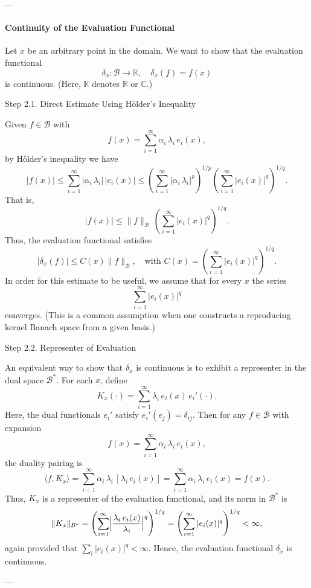 ---

\paragraph{Continuity of the Evaluation Functional}

Let \(x\) be an arbitrary point in the domain. We want to show that the evaluation functional
\[
\delta_x : \mathcal{B} \to \mathbb{K},\quad \delta_x(f)=f(x)
\]
is continuous. (Here, \(\mathbb{K}\) denotes \(\mathbb{R}\) or \(\mathbb{C}\).)

Step 2.1. Direct Estimate Using Hölder’s Inequality

Given \(f\in\mathcal{B}\) with
\[
f(x)=\sum_{i=1}^\infty \alpha_i\,\lambda_i\, e_i(x),
\]
by Hölder’s inequality we have
\[
|f(x)| \le \sum_{i=1}^\infty |\alpha_i\,\lambda_i|\, |e_i(x)|
\le \left(\sum_{i=1}^\infty |\alpha_i\,\lambda_i|^p\right)^{1/p}\left(\sum_{i=1}^\infty |e_i(x)|^q\right)^{1/q}.
\]
That is,
\[
|f(x)| \le \|f\|_{\mathcal{B}}\,\left(\sum_{i=1}^\infty |e_i(x)|^q\right)^{1/q}.
\]
Thus, the evaluation functional satisfies
\[
|\delta_x(f)| \le C(x)\|f\|_{\mathcal{B}},\quad \text{with } C(x)=\left(\sum_{i=1}^\infty |e_i(x)|^q\right)^{1/q}.
\]
In order for this estimate to be useful, we assume that for every \(x\) the series
\[
\sum_{i=1}^\infty |e_i(x)|^q
\]
converges. (This is a common assumption when one constructs a reproducing kernel Banach space from a given basis.)

Step 2.2. Representer of Evaluation

An equivalent way to show that \(\delta_x\) is continuous is to exhibit a representer in the dual space \(\mathcal{B}^*\). For each \(x\), define
\[
K_x(\cdot) = \sum_{i=1}^\infty \lambda_i\, e_i(x)\, e_i'(\cdot).
\]
Here, the dual functionals \(e_i'\) satisfy \(e_i'(e_j)=\delta_{ij}\). Then for any \(f\in \mathcal{B}\) with expansion
\[
f(x)= \sum_{i=1}^\infty \alpha_i\,\lambda_i\, e_i(x),
\]
the duality pairing is
\[
\langle f, K_x\rangle = \sum_{i=1}^\infty \alpha_i\,\lambda_i\,[\lambda_i\, e_i(x)]
= \sum_{i=1}^\infty \alpha_i\,\lambda_i\, e_i(x)=f(x).
\]
Thus, \(K_x\) is a representer of the evaluation functional, and its norm in \(\mathcal{B}^*\) is
\[
\|K_x\|_{\mathcal{B}^*} = \left(\sum_{i=1}^\infty \Bigl|\frac{\lambda_i\,e_i(x)}{\lambda_i}\Bigr|^q\right)^{1/q}
=\left(\sum_{i=1}^\infty |e_i(x)|^q\right)^{1/q}<\infty,
\]
again provided that \(\sum_i|e_i(x)|^q<\infty\). Hence, the evaluation functional \(\delta_x\) is continuous.

---

